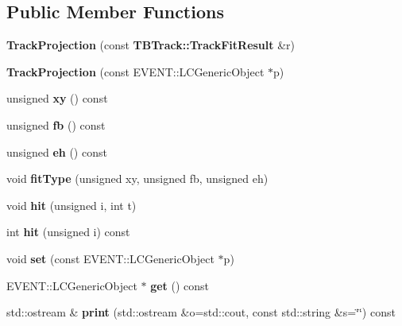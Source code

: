 \subsection*{Public Member Functions}
\begin{DoxyCompactItemize}
\item 
{\bfseries TrackProjection} (const {\bf TBTrack::TrackFitResult} \&r)\label{classTBTrack_1_1TrackProjection_a5687005151617c3972c01967fe2da734}

\item 
{\bfseries TrackProjection} (const EVENT::LCGenericObject $\ast$p)\label{classTBTrack_1_1TrackProjection_a3113d8b470f7a8e4de211e43a7d50fd6}

\item 
unsigned {\bfseries xy} () const \label{classTBTrack_1_1TrackProjection_a9d48d08c834d07e778d4381fb974505b}

\item 
unsigned {\bfseries fb} () const \label{classTBTrack_1_1TrackProjection_ad24e264233b83d4c9cd813881f2fbac7}

\item 
unsigned {\bfseries eh} () const \label{classTBTrack_1_1TrackProjection_a44289793d84283f8ff664659fd25821e}

\item 
void {\bfseries fitType} (unsigned xy, unsigned fb, unsigned eh)\label{classTBTrack_1_1TrackProjection_ae0c43b50ae45c6e13c4bb01f09b3e74f}

\item 
void {\bfseries hit} (unsigned i, int t)\label{classTBTrack_1_1TrackProjection_ad2e6a1f8c2a971adf982d67b571f7292}

\item 
int {\bfseries hit} (unsigned i) const \label{classTBTrack_1_1TrackProjection_a3f563df4496127397acd6f047797ba0c}

\item 
void {\bfseries set} (const EVENT::LCGenericObject $\ast$p)\label{classTBTrack_1_1TrackProjection_ad31ce23afa4dd066bd49bc30ba7962fe}

\item 
EVENT::LCGenericObject $\ast$ {\bfseries get} () const \label{classTBTrack_1_1TrackProjection_abbf79bbd22e4f0c139277bb90ee4ccdd}

\item 
std::ostream \& {\bfseries print} (std::ostream \&o=std::cout, const std::string \&s=\char`\"{}\char`\"{}) const \label{classTBTrack_1_1TrackProjection_ab01859ecafcdf84813fa159a9a716d4d}

\end{DoxyCompactItemize}
